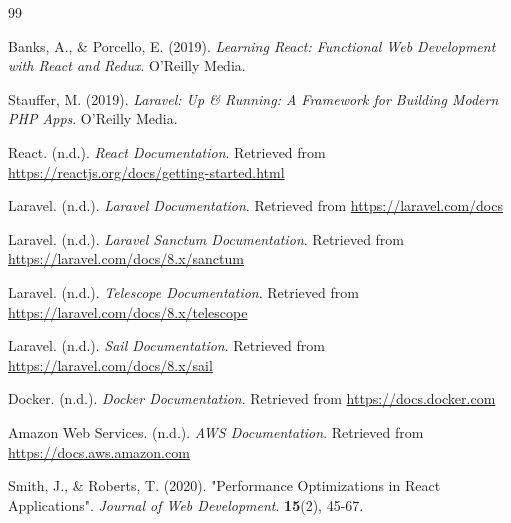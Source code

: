 \begin{thebibliography}{99}

Banks, A., \& Porcello, E. (2019). \textit{Learning React: Functional Web Development with React and Redux}. O'Reilly Media.

Stauffer, M. (2019). \textit{Laravel: Up \& Running: A Framework for Building Modern PHP Apps}. O'Reilly Media.

React. (n.d.). \textit{React Documentation}. Retrieved from \url{https://reactjs.org/docs/getting-started.html}

Laravel. (n.d.). \textit{Laravel Documentation}. Retrieved from \url{https://laravel.com/docs}

Laravel. (n.d.). \textit{Laravel Sanctum Documentation}. Retrieved from \url{https://laravel.com/docs/8.x/sanctum}

Laravel. (n.d.). \textit{Telescope Documentation}. Retrieved from \url{https://laravel.com/docs/8.x/telescope}

Laravel. (n.d.). \textit{Sail Documentation}. Retrieved from \url{https://laravel.com/docs/8.x/sail}

Docker. (n.d.). \textit{Docker Documentation}. Retrieved from \url{https://docs.docker.com}

Amazon Web Services. (n.d.). \textit{AWS Documentation}. Retrieved from \url{https://docs.aws.amazon.com}

Smith, J., \& Roberts, T. (2020). "Performance Optimizations in React Applications". \textit{Journal of Web Development}. \textbf{15}(2), 45-67.
\end{thebibliography}
